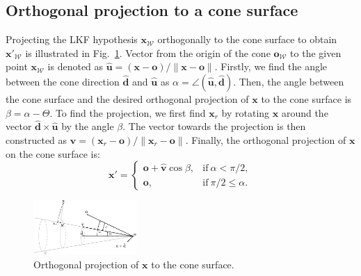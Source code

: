 \documentclass[a4paper,11pt,titlepage,twoside]{book}
\newcommand{\reffig}[1]{Fig.~\ref{#1}}
\begin{document}

\subsection{Orthogonal projection to a cone surface}

Projecting the \ac{LKF} hypothesis $\mathbf{x}_\mathcal{W}$ orthogonally to the cone surface to obtain ${\mathbf{x}'}_\mathcal{W}$ is illustrated in \reffig{fig:orthogonal_projection}.
Vector from the origin of the cone $\mathbf{o}_\mathcal{W}$ to the given point $\mathbf{x}_\mathcal{W}$ is denoted as $\mathbf{\hat{u}} = (\mathbf{x} - \mathbf{o})/\|\mathbf{x} - \mathbf{o}\|$.
Firstly, we find the angle between the cone direction $\mathbf{\hat{d}}$ and $\mathbf{\hat{u}}$ as $\alpha = \angle(\mathbf{\hat{u}}, \mathbf{\hat{d}})$.
Then, the angle between the cone surface and the desired orthogonal projection of $\mathbf{x}$ to the cone surface is $\beta = \alpha - \Theta$.
To find the projection, we first find $\mathbf{x}_r$ by rotating $\mathbf{x}$ around the vector $\mathbf{\hat{d}} \times \mathbf{\hat{u}}$ by the angle $\beta$.
The vector towards the projection is then constructed as $\mathbf{\hat{v}} = (\mathbf{x}_r - \mathbf{o})/\|\mathbf{x}_r - \mathbf{o}\|$.
Finally, the orthogonal projection of $\mathbf{x}$ on the cone surface is:
\begin{equation}
  \mathbf{x}' = \begin{cases}
    \mathbf{o} + \mathbf{\hat{v}}\cos\beta, & \text{if}\ \alpha < \pi/2,\\
    \mathbf{o}, & \text{if}\ \pi/2 \leq \alpha.
  \end{cases}
\end{equation}


\begin{figure}
  \centering
  \includegraphics[width=0.35\textwidth]{./fig/sketch/orthogonal_projection.pdf}
  \caption{Orthogonal projection of $\mathbf{x}$ to the cone surface.}
  \label{fig:orthogonal_projection}
\end{figure}



\end{document}
